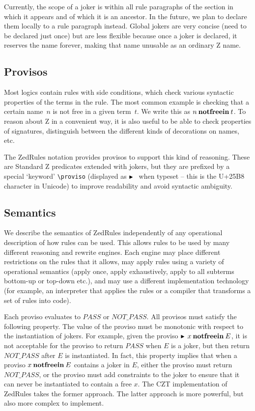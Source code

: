 \documentclass{entcs}
\begin{document}
Currently, the scope of a joker is within all rule paragraphs of the
section in which it appears and of which it is an ancestor.  In the
future, we plan to declare them locally to a rule paragraph instead.
Global jokers are very concise (need to be declared just once) but are
less flexible because once a joker is declared, it reserves the name
forever, making that name unusable as an ordinary Z name.

\subsection{Provisos}

Most logics contain rules with side conditions, which check various
syntactic properties of the terms in the rule.  The most common
example is checking that a certain name~$n$ is not free in a given
term~$t$.  We write this as $n \mathbin{\mathop{\mathstrut{\mbox{\textbf{notfreein}}}}\nolimits} t$.  To reason about Z in a
convenient way, it is also useful to be able to check properties of
signatures, distinguish between the different kinds of decorations on
names, etc.

The ZedRules notation provides provisos to support this kind of
reasoning.  These are Standard Z predicates extended with jokers, but
they are prefixed by a special `keyword' \verb!\proviso! (displayed as
$\proviso$ when typeset -- this is the U+25B8 character in Unicode) to
improve readability and avoid syntactic ambiguity.

\subsection{Semantics}

We describe the semantics of ZedRules independently of any operational
description of how rules can be used.  This allows rules to be used by
many different reasoning and rewrite engines.  Each engine may place
different restrictions on the rules that it allows, may apply rules
using a variety of operational semantics (apply once, apply
exhaustively, apply to all subterms bottom-up or top-down etc.), and
may use a different implementation technology (for example, an
interpreter that applies the rules or a compiler that transforms a set
of rules into code).

Each proviso evaluates to $PASS$ or $NOT\_PASS$.  All provisos must
satisfy the following property.  The value of the proviso must be
monotonic with respect to the instantiation of jokers.  For example,
given the proviso $\proviso x \notfreein E$, it is not acceptable for
the proviso to return $PASS$ when $E$ is a joker, but then return
$NOT\_PASS$ after $E$ is instantiated.  In fact, this property implies
that when a proviso $x \mathbin{\mathop{\mathstrut{\mbox{\textbf{notfreein}}}}\nolimits} E$ contains a joker in $E$, either
the proviso must return $NOT\_PASS$, or the proviso must add
constraints to the joker to ensure that it can never be instantiated
to contain a free $x$.  The CZT implementation of ZedRules takes the
former approach.  The latter approach is more powerful, but also more
complex to implement.
\end{document}
